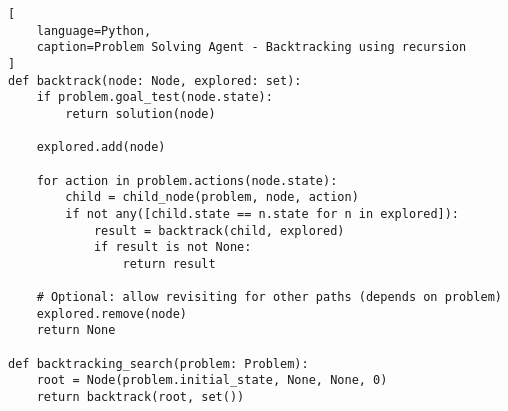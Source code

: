 \begin{lstlisting}[
    language=Python,
    caption=Problem Solving Agent - Backtracking using recursion
]
def backtrack(node: Node, explored: set):
    if problem.goal_test(node.state):
        return solution(node)

    explored.add(node)

    for action in problem.actions(node.state):
        child = child_node(problem, node, action)
        if not any([child.state == n.state for n in explored]):
            result = backtrack(child, explored)
            if result is not None:
                return result
    
    # Optional: allow revisiting for other paths (depends on problem)
    explored.remove(node)  
    return None

def backtracking_search(problem: Problem):
    root = Node(problem.initial_state, None, None, 0)
    return backtrack(root, set())
\end{lstlisting}














